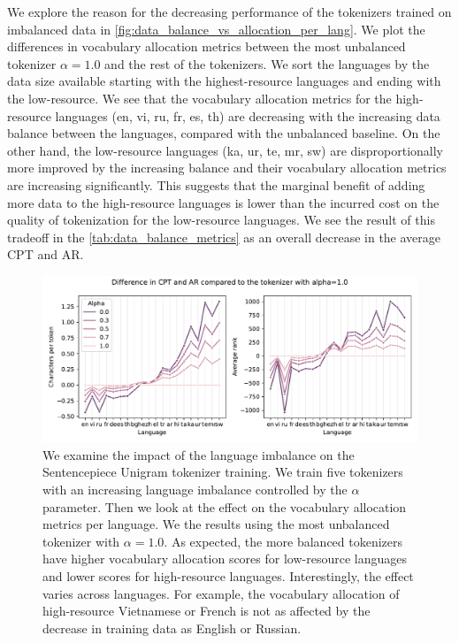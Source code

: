 We explore the reason for the decreasing performance of the tokenizers trained on imbalanced data in \autoref{fig:data_balance_vs_allocation_per_lang}. We plot the differences in vocabulary allocation metrics between the most unbalanced tokenizer $\alpha=1.0$ and the rest of the tokenizers. We sort the languages by the data size available starting with the highest-resource languages and ending with the low-resource. We see that the vocabulary allocation metrics for the high-resource languages (en, vi, ru, fr, es, th) are decreasing with the increasing data balance between the languages, compared with the unbalanced baseline. On the other hand, the low-resource languages (ka, ur, te, mr, sw) are disproportionally more improved by the increasing balance and their vocabulary allocation metrics are increasing significantly. This suggests that the marginal benefit of adding more data to the high-resource languages is lower than the incurred cost on the quality of tokenization for the low-resource languages. We see the result of this tradeoff in the \autoref{tab:data_balance_metrics} as an overall decrease in the average CPT and AR.

\begin{figure}[H]
    \centering
    \includegraphics[width=\textwidth]{figures/ar_cpt_vs_alpha.pdf}
    \caption{We examine the impact of the language imbalance on the Sentencepiece Unigram tokenizer training. We train five tokenizers with an increasing language imbalance controlled by the $\alpha$ parameter. Then we look at the effect on the vocabulary allocation metrics per language. We  the results using the most unbalanced tokenizer with $\alpha=1.0$. As expected, the more balanced tokenizers have higher vocabulary allocation scores for low-resource languages and lower scores for high-resource languages. Interestingly, the effect varies across languages. For example, the vocabulary allocation of high-resource Vietnamese or French is not as affected by the decrease in training data as English or Russian.}
    \label{fig:data_balance_vs_allocation_per_lang}
\end{figure}


